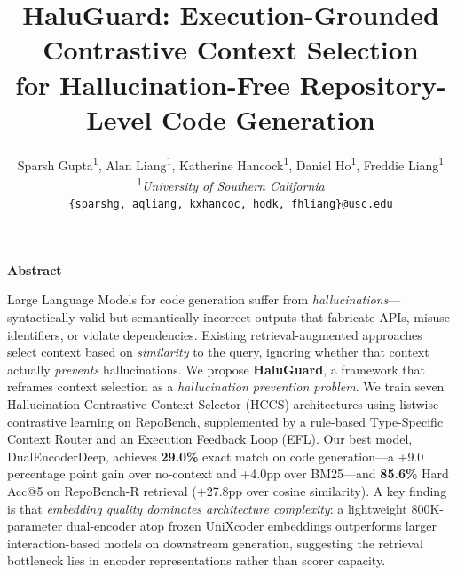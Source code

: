 \documentclass[11pt,a4paper]{article}
\title{HaluGuard: Execution-Grounded Contrastive Context Selection\\ for Hallucination-Free Repository-Level Code Generation}
\author{
  Sparsh Gupta\textsuperscript{1},
  Alan Liang\textsuperscript{1},
  Katherine Hancock\textsuperscript{1},
  Daniel Ho\textsuperscript{1},
  Freddie Liang\textsuperscript{1} \\[0.5em]
  \textsuperscript{1}\textit{University of Southern California} \\
  \texttt{\{sparshg, aqliang, kxhancoc, hodk, fhliang\}@usc.edu}
}
\date{}
\makeatletter
\renewenvironment{abstract}{%
    \begin{center}
    \textbf{Abstract}
    \end{center}
    \itshape
    \small
}{\vspace{0.5em}}
\renewcommand{\maketitle}{%
    \begin{center}
    {\Large\bfseries \@title \par}
    \vspace{1.2em}
    {\normalsize \@author \par}
    \vspace{1.5em}
    \end{center}
}
\makeatother
\begin{document}
\maketitle

\begin{abstract}
Large Language Models for code generation suffer from \textit{hallucinations}---syntactically valid but semantically incorrect outputs that fabricate APIs, misuse identifiers, or violate dependencies. Existing retrieval-augmented approaches select context based on \textit{similarity} to the query, ignoring whether that context actually \textit{prevents} hallucinations. We propose \textbf{HaluGuard}, a framework that reframes context selection as a \textit{hallucination prevention problem}. We train seven Hallucination-Contrastive Context Selector (HCCS) architectures using listwise contrastive learning on RepoBench, supplemented by a rule-based Type-Specific Context Router and an Execution Feedback Loop (EFL). Our best model, DualEncoderDeep, achieves \textbf{29.0\%} exact match on code generation---a +9.0 percentage point gain over no-context and +4.0pp over BM25---and \textbf{85.6\%} Hard Acc@5 on RepoBench-R retrieval (+27.8pp over cosine similarity). A key finding is that \textit{embedding quality dominates architecture complexity}: a lightweight 800K-parameter dual-encoder atop frozen UniXcoder embeddings outperforms larger interaction-based models on downstream generation, suggesting the retrieval bottleneck lies in encoder representations rather than scorer capacity.
\end{abstract}
\end{document}
